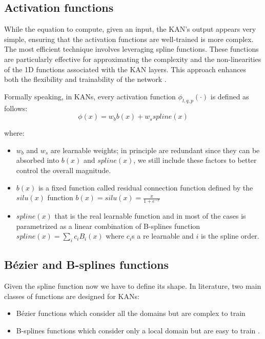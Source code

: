 \documentclass[12pt,a4paper]{article}
\begin{document}
\subsection{Activation functions}
While the equation to compute, given an input, the KAN's output appears very simple, ensuring that the activation functions are well-trained is more complex. The most efficient technique involves leveraging spline functions. These functions are particularly effective for approximating the complexity and the non-linearities of the 1D functions associated with the KAN layers. This approach enhances both the flexibility and trainability of the network \cite{KAN}.

Formally speaking, in KANs, every activation function $\phi_{l,q,p}(\cdot)$ is defined as follows:
$$\phi(x) = w_bb(x) + w_sspline(x) $$

where:
\begin{itemize}
    \item $w_b$ and $w_s$ are learnable weights; in principle are redundant since they can be absorbed into $b(x)$ and $spline(x)$, we still include these factors to better control the overall magnitude.
    \item $b(x)$ is a fixed function called residual connection function defined by the $silu(x)$ function $b(x) = silu(x) = \frac{x}{1+e^{-x}}$
    \item $spline(x)$ that is the real learnable function and in most of the cases is parametrized as a linear combination of B-splines function $spline(x)= \sum_i c_iB_i(x)$ where $c_i$s a re learnable and $i$ is the spline order.
\end{itemize}

\subsection{Bézier and B-splines functions}
Given the spline function now we have to define its shape. In literature, two main classes of functions are designed for KANs:
\begin{itemize}
    \item Bézier functions which consider all the domains but are complex to train \cite{bezier}
    \item B-splines functions which consider only a local domain but are easy to train \cite{kan_intro}.
\end{itemize}
\end{document}
